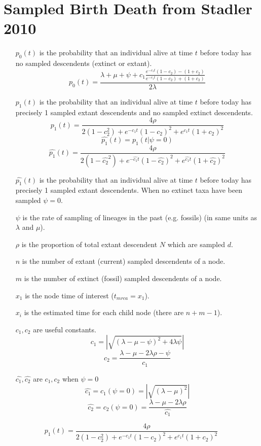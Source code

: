 \documentclass{llncs}
\begin{document}
\section{Sampled Birth Death from Stadler 2010 \cite{Stadler2010}}


\begin{enumerate}
\item[$p_0(t)$]  is the probability that an individual alive at time $t$ before today has no sampled descendents (extinct or extant).
$$p_0(t) = \frac{\lambda+\mu+\psi+c_1\frac{e^{-c_1t}(1-c_2)-(1+c_2)}{e^{-c_1t}(1-c_2)+(1+c_2)}}{2\lambda}$$
\item[$p_1(t)$]  is the probability that an individual alive at time $t$ before today has precisely 1 sampled extant descendents and no sampled extinct descendents.
$${p_1}(t) = \frac{4\rho}{2(1-c_2^2)+e^{-c_1t}(1-c_2)^2+e^{c_1t}(1+c_2)^2}$$
$$\hat{p_1}(t) = p_1(t|\psi=0)$$
$$\hat{p_1}(t) = \frac{4\rho}{2(1-\hat{c_2}^2)+e^{-\hat{c_1}t}(1-\hat{c_2})^2+e^{\hat{c_1}t}(1+\hat{c_2})^2}$$
\item[$\hat{p_1}(t)$]  is the probability that an individual alive at time $t$ before today has precisely 1 sampled extant descendents. When no extinct taxa have been sampled $\psi = 0$.
\item[$\psi$]  is the rate of sampling of lineages in the past (e.g. fossils) (in same units as $\lambda$ and $\mu$).
\item[$\rho$ ] is the proportion of total extant descendent $N$ which are sampled $d$.
\item[$n$] is the number of extant (current) sampled descendents of a node.
\item[$m$] is the number of extinct (fossil) sampled descendents of a node.
\item[$x_1$]  is the node time of interest ($t_{mrca}=x_1$).
\item[$x_i$]  is the estimated time for each child node (there are $n+m-1$).
\item[$c_1,c_2$]  are useful constants.
$$c_1 = |\sqrt{(\lambda-\mu-\psi)^2 + 4\lambda\psi}|$$
$$c_2 = \frac{\lambda-\mu-2\lambda\rho-\psi}{c_1}$$
\item[$\hat{c_1},\hat{c_2}$]  are $c_1,c_2$ when $\psi=0$
$$\hat{c_1}=c_1(\psi=0) = |\sqrt{(\lambda-\mu)^2}|$$
$$\hat{c_2}=c_2(\psi=0) = \frac{\lambda-\mu-2\lambda\rho}{\hat{c_1}}$$

\end{enumerate}




$${p_1}(t) = \frac{4\rho}{2(1-c_2^2)+e^{-c_1t}(1-c_2)^2+e^{c_1t}(1+c_2)^2}$$
\end{document}
